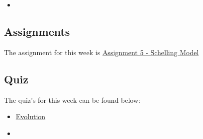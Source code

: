\begin{itemize}
    \item {}
\end{itemize}

\subsection{Assignments}

The assignment for this week is \href{https://github.com/QuantumCompiler/CU/tree/main/CSPB%203702%20-%20Cognitive%20Science/CSPB%203702%20-%20Assignments/CSPB%203702%20-%20Assignment%205%20-%20Schelling%20Model}{Assignment 5 - Schelling Model} \due{(12/14/23)} 

\subsection{Quiz}

The quiz's for this week can be found below:

\begin{itemize}
    \item \href{https://applied.cs.colorado.edu/mod/quiz/view.php?id=49436}{Evolution}  
    \item {}
\end{itemize}